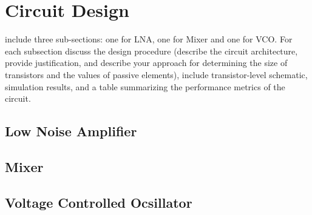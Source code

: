 \section{Circuit Design}
include three sub-sections: one for LNA, one for Mixer and one for VCO. For each subsection discuss the design procedure (describe the circuit architecture, provide justification, and describe your approach for determining the size of transistors and the values of passive elements), include transistor-level schematic, simulation results, and a table summarizing the performance metrics of the circuit.

\subsection{Low Noise Amplifier}

\subsection{Mixer}

\subsection{Voltage Controlled Ocsillator}